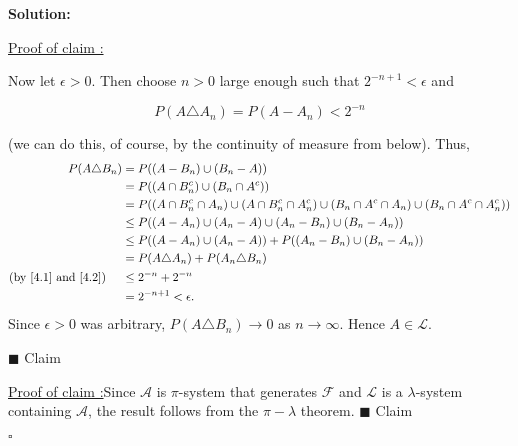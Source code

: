 \documentclass[12pt]{article}
\newcounter{ProofCounter}
\newcounter{ClaimCounter}[ProofCounter]
\newenvironment{Solution}{\stepcounter{ProofCounter}\textbf{Solution:}}{\hfill$\square$}
\newenvironment{claim}[1]{\vspace{1mm}\stepcounter{ClaimCounter}\par\noindent\underline{\bf Claim \theClaimCounter:}\space#1}{}
\newenvironment{claimproof}[1]{\par\noindent\underline{Proof of claim \theClaimCounter:}\space#1}{\hfill $\blacksquare$ Claim \theClaimCounter}
\begin{document}
\begin{Solution}
\begin{claimproof}
\begin{enumerate}
        Now let $\epsilon > 0$. Then choose $n > 0$ large enough such that $2^{-n + 1} < \epsilon$ and 

        \begin{equation}
          P(A \triangle A_n) = P(A - A_n) < 2^{-n}
          \label{4.2}
        \end{equation}
        
        (we can do this, of course, by the continuity of measure from below). Thus,
        \begin{align*}
          P( A \triangle B_n ) & = P( (A - B_n) \cup (B_n - A) ) \\
          & = P( (A \cap B_n^c) \cup (B_n \cap A^c) ) \\
          & = P( (A \cap B_n^c \cap A_n) \cup (A \cap B_n^c \cap A_n^c) \cup (B_n \cap A^c \cap A_n) \cup (B_n \cap A^c \cap A_n^c) ) \\
          & \leq P( (A - A_n) \cup (A_n - A) \cup (A_n - B_n) \cup (B_n - A_n) ) \\
          & \leq P( (A - A_n) \cup (A_n - A) ) + P( (A_n - B_n) \cup (B_n - A_n) ) \\
          & = P(A \triangle A_n) + P(A_n \triangle B_n) \\
          \text{(by \eqref{4.1} and \eqref{4.2})} \ \ \ \ & \leq 2^{-n} + 2^{-n} \\
          & = 2^{-n + 1} < \epsilon.
        \end{align*}
        Since $\epsilon > 0$ was arbitrary, $P(A \triangle B_n) \rightarrow 0$ as $n \rightarrow \infty$. Hence $A \in \mathcal{L}$.
    \end{enumerate}
  \end{claimproof}

  \begin{claimproof}
    Since $\mathcal{A}$ is $\pi$-system that generates $\mathcal{F}$ and $\mathcal{L}$ is a $\lambda$-system containing $\mathcal{A}$, the result follows from the $\pi-\lambda$ theorem.
  \end{claimproof}


\end{Solution}
\end{document}
